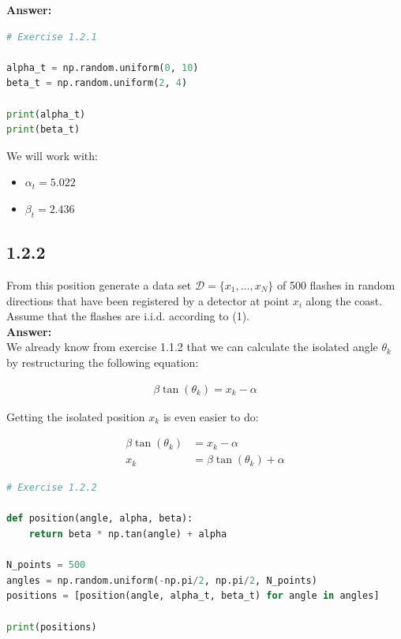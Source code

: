 \documentclass[a4paper]{article}
\begin{document}
\textbf{Answer:}\\

\begin{lstlisting}[language=Python]
# Exercise 1.2.1

alpha_t = np.random.uniform(0, 10) 
beta_t = np.random.uniform(2, 4)

print(alpha_t)
print(beta_t)
\end{lstlisting}

We will work with:

\begin{itemize}
	\item $\alpha_t = 5.022$
	\item $\beta_t = 2.436$
\end{itemize}

\subsection*{1.2.2}

From this position generate a data set $\mathcal{D} = \{ x_1,..., x_N \}$ of 500 flashes in random directions that have been registered by a detector at point $x_i$ along the coast. Assume that the flashes are i.i.d. according to (1).\\

\textbf{Answer:}\\

We already know from exercise 1.1.2 that we can calculate the isolated angle $\theta_k$ by restructuring the following equation: 

\begin{align*}
 \beta \tan(\theta_k) = x_k - \alpha
\end{align*}

Getting the isolated position $x_k$ is even easier to do:

\begin{align*}
\beta \tan(\theta_k) &= x_k - \alpha\\
x_k &= \beta \tan(\theta_k) + \alpha
\end{align*}

\begin{lstlisting}[language=Python]
# Exercise 1.2.2

def position(angle, alpha, beta): 
    return beta * np.tan(angle) + alpha

N_points = 500
angles = np.random.uniform(-np.pi/2, np.pi/2, N_points)
positions = [position(angle, alpha_t, beta_t) for angle in angles]

print(positions)
\end{lstlisting}
\end{document}
